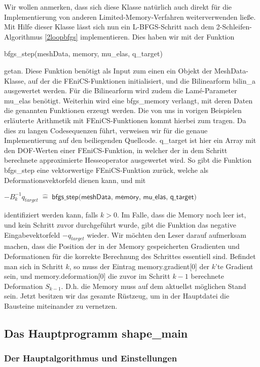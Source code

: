 Wir wollen anmerken, dass sich diese Klasse natürlich auch direkt für die Implementierung von anderen Limited-Memory-Verfahren weiterverwenden ließe. 
Mit Hilfe dieser Klasse lässt sich nun ein L-BFGS-Schritt nach dem 2-Schleifen-Algorithmus \ref{2loopbfgs} implementieren. Dies haben wir mit der Funktion 
\begin{center}
\textsf{bfgs\_step(meshData, memory, mu\_elas, q\_target)}
\end{center} 
getan. Diese Funktion benötigt als Input zum einen ein Objekt der  \textsf{MeshData}-Klasse, auf der die FEniCS-Funktionen initialisiert, und die Bilinearform \textsf{bilin\_a} ausgewertet werden. Für die Bilinearform wird zudem die Lamé-Parameter \textsf{mu\_elas} benötigt. Weiterhin wird eine \textsf{bfgs\_memory} verlangt, mit deren Daten die genannten Funktionen erzeugt werden. Die von uns in vorigen Beispielen erläuterte Arithmetik mit FEniCS-Funktionen kommt hierbei zum tragen. Da dies zu langen Codesequenzen führt, verweisen wir für die genaue Implementierung auf den beiliegenden Quellcode. \textsf{q\_target} ist hier ein Array mit den DOF-Werten einer FEniCS-Funktion, in welcher der in dem Schritt berechnete approximierte Hesseoperator ausgewertet wird. So gibt die Funktion \textsf{bfgs\_step} eine vektorwertige FEniCS-Funktion zurück, welche als Deformationsvektorfeld dienen kann, und mit
\begin{center}
$-B_k^{-1} q_{target} \; \hat{=} \; \textsf{bfgs\_step(meshData, memory, mu\_elas, q\_target)}$
\end{center}
identifiziert werden kann, falls $k>0$. Im Falle, dass die Memory noch leer ist, und kein Schritt zuvor durchgeführt wurde, gibt die Funktion das negative Eingabevektorfeld \textsf{$-q_{target}$} wieder. Wir möchten den Leser darauf aufmerksam machen, dass die Position der in der Memory gespeicherten Gradienten und Deformationen für die korrekte Berechnung des Schrittes essentiell sind. Befindet man sich in Schritt $k$, so muss der Eintrag \textsf{memory.gradient[0]} der $k$'te Gradient sein, und \textsf{memory.deformation[0]} die zuvor im Schritt $k-1$ berechnete Deformation $S_{k-1}$. D.h. die Memory muss auf dem aktuellst möglichen Stand sein. Jetzt besitzen wir das gesamte Rüstzeug, um in der Hauptdatei die Bausteine miteinander zu vernetzen.

\subsection{Das Hauptprogramm shape\_main}
\subsubsection{Der Hauptalgorithmus und Einstellungen}

